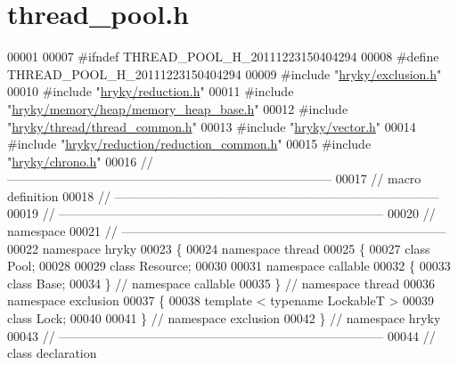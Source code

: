 \hypertarget{thread__pool_8h_source}{\section{thread\-\_\-pool.\-h}
}

\begin{DoxyCode}
00001 
00007 \textcolor{preprocessor}{#ifndef THREAD\_POOL\_H\_20111223150404294}
00008 \textcolor{preprocessor}{}\textcolor{preprocessor}{#define THREAD\_POOL\_H\_20111223150404294}
00009 \textcolor{preprocessor}{}\textcolor{preprocessor}{#include "\hyperlink{exclusion_8h}{hryky/exclusion.h}"}
00010 \textcolor{preprocessor}{#include "\hyperlink{reduction_8h}{hryky/reduction.h}"}
00011 \textcolor{preprocessor}{#include "\hyperlink{memory__heap__base_8h}{hryky/memory/heap/memory_heap_base.h}"}
00012 \textcolor{preprocessor}{#include "\hyperlink{thread__common_8h}{hryky/thread/thread_common.h}"}
00013 \textcolor{preprocessor}{#include "\hyperlink{vector_8h}{hryky/vector.h}"}
00014 \textcolor{preprocessor}{#include "\hyperlink{reduction__common_8h}{hryky/reduction/reduction_common.h}"}
00015 \textcolor{preprocessor}{#include "\hyperlink{chrono_8h}{hryky/chrono.h}"}
00016 \textcolor{comment}{//
      ------------------------------------------------------------------------------}
00017 \textcolor{comment}{// macro definition}
00018 \textcolor{comment}{//
      ------------------------------------------------------------------------------}
00019 \textcolor{comment}{//
      ------------------------------------------------------------------------------}
00020 \textcolor{comment}{// namespace}
00021 \textcolor{comment}{//
      ------------------------------------------------------------------------------}
00022 \textcolor{keyword}{namespace }hryky
00023 \{
00024 \textcolor{keyword}{namespace }thread
00025 \{
00027     \textcolor{keyword}{class }Pool;
00028 
00029     \textcolor{keyword}{class }Resource;
00030 
00031 \textcolor{keyword}{namespace }callable
00032 \{
00033     \textcolor{keyword}{class }Base;
00034 \} \textcolor{comment}{// namespace callable}
00035 \} \textcolor{comment}{// namespace thread}
00036 \textcolor{keyword}{namespace }exclusion
00037 \{
00038     \textcolor{keyword}{template} < \textcolor{keyword}{typename} LockableT >
00039     \textcolor{keyword}{class }Lock;
00040     
00041 \} \textcolor{comment}{// namespace exclusion}
00042 \} \textcolor{comment}{// namespace hryky}
00043 \textcolor{comment}{//
      ------------------------------------------------------------------------------}
00044 \textcolor{comment}{// class declaration}

\end{DoxyCode}
